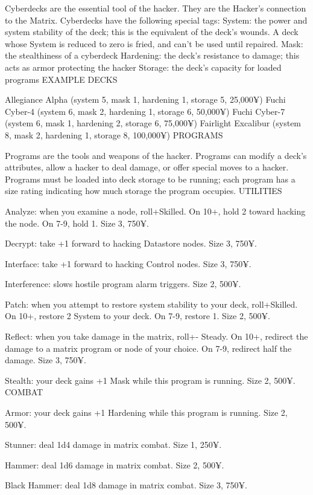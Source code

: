 Cyberdecks are the essential tool of the hacker. They are the Hacker’s connection to the Matrix. Cyberdecks have the following special tags:
System: the power and system stability of the deck; this is the equivalent of the deck’s wounds. A deck whose System is reduced to zero is fried, and can’t be used until repaired.
Mask: the stealthiness of a cyberdeck
Hardening: the deck’s resistance to damage; this acts as armor protecting the hacker
Storage: the deck’s capacity for loaded programs
EXAMPLE DECKS

Allegiance Alpha (system 5, mask 1, hardening 1, storage 5, 25,000¥)
Fuchi Cyber-4 (system 6, mask 2, hardening 1, storage 6, 50,000¥)
Fuchi Cyber-7 (system 6, mask 1, hardening 2, storage 6, 75,000¥)
Fairlight Excalibur (system 8, mask 2, hardening 1, storage 8, 100,000¥)
PROGRAMS

Programs are the tools and weapons of the hacker. Programs can modify a deck’s attributes, allow a hacker to deal damage, or offer special moves to a hacker. Programs must be loaded into deck storage to be running; each program has a size rating indicating how much storage the program occupies.
UTILITIES

Analyze: when you examine a node, roll+Skilled. On 10+, hold 2 toward hacking the node. On 7-9, hold 1. Size 3, 750¥.

Decrypt: take +1 forward to hacking Datastore nodes. Size 3, 750¥.

Interface: take +1 forward to hacking Control nodes. Size 3, 750¥.

Interference: slows hostile program alarm triggers. Size 2, 500¥.

Patch: when you attempt to restore system stability to your deck, roll+Skilled. On 10+, restore 2 System to your deck. On 7-9, restore 1. Size 2, 500¥.

Reflect: when you take damage in the matrix, roll+- Steady. On 10+, redirect the damage to a matrix program or node of your choice. On 7-9, redirect half the damage. Size 3, 750¥.

Stealth: your deck gains +1 Mask while this program is running. Size 2, 500¥.
COMBAT

Armor: your deck gains +1 Hardening while this program is running. Size 2, 500¥.

Stunner: deal 1d4 damage in matrix combat. Size 1, 250¥.

Hammer: deal 1d6 damage in matrix combat. Size 2, 500¥.

Black Hammer: deal 1d8 damage in matrix combat. Size 3, 750¥.

